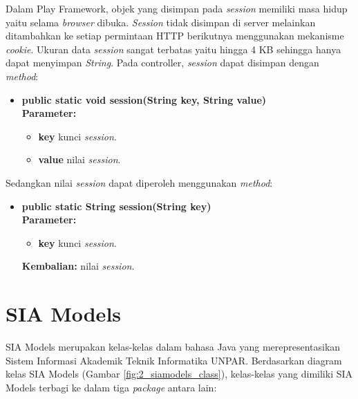 Dalam Play Framework, objek yang disimpan pada \textit{session} memiliki masa hidup yaitu selama \textit{browser} dibuka. \textit{Session} tidak disimpan di server melainkan ditambahkan ke setiap permintaan HTTP berikutnya menggunakan mekanisme \textit{cookie}. Ukuran data \textit{session} sangat terbatas yaitu hingga 4 KB sehingga hanya dapat menyimpan \textit{String}. Pada controller, \textit{session} dapat disimpan dengan \textit{method}:
	\begin{itemize}
			\item \textbf{public static void session(String key, String value)} \\
				\textbf{Parameter:}
				\begin{itemize}
					\item \textbf{key} kunci \textit{session}.
					\item \textbf{value} nilai \textit{session}.
				\end{itemize}
	\end{itemize}
 Sedangkan nilai \textit{session} dapat diperoleh menggunakan \textit{method}: 
\begin{itemize}
			\item \textbf{public static String session(String key)} \\
				\textbf{Parameter:}
				\begin{itemize}
					\item \textbf{key} kunci \textit{session}.
				\end{itemize}
				\textbf{Kembalian:} nilai \textit{session}.
	\end{itemize}


\section{SIA Models}
\label{sec:siamodels}
SIA Models merupakan kelas-kelas dalam bahasa Java yang merepresentasikan Sistem Informasi Akademik Teknik Informatika UNPAR\cite{siamodels}. Berdasarkan diagram kelas SIA Models (Gambar \ref{fig:2_siamodels_class}), kelas-kelas yang dimiliki SIA Models terbagi ke dalam tiga \textit{package} antara lain:

